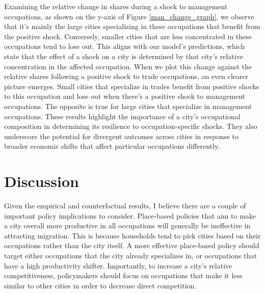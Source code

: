 \documentclass[10pt]{article}
\begin{document}
Examining the relative change in shares during a shock to management occupations, as shown on the y-axis of Figure \ref{man_change_graph}, we observe that it's mainly the large cities specializing in these occupations that benefit from the positive shock. Conversely, smaller cities that are less concentrated in these occupations tend to lose out. This aligns with our model's predictions, which state that the effect of a shock on a city is determined by that city's relative concentration in the affected occupation.
When we plot this change against the relative shares following a positive shock to trade occupations, an even clearer picture emerges. Small cities that specialize in trades benefit from positive shocks to this occupation and lose out when there's a positive shock to management occupations. The opposite is true for large cities that specialize in management occupations. These results highlight the importance of a city's occupational composition in determining its resilience to occupation-specific shocks. They also underscore the potential for divergent outcomes across cities in response to broader economic shifts that affect particular occupations differently.


\section{Discussion}

Given the empirical and counterfactual results, I believe there are a couple of important policy implications to consider. Place-based policies that aim to make a city overall more productive in all occupations will generally be ineffective in attracting migration. This is because households tend to pick cities based on their occupations rather than the city itself. A more effective place-based policy should target either occupations that the city already specializes in, or occupations that have a high productivity shifter. Importantly, to increase a city's relative competitiveness, policymakers should focus on occupations that make it less similar to other cities in order to decrease direct competition.
\end{document}
